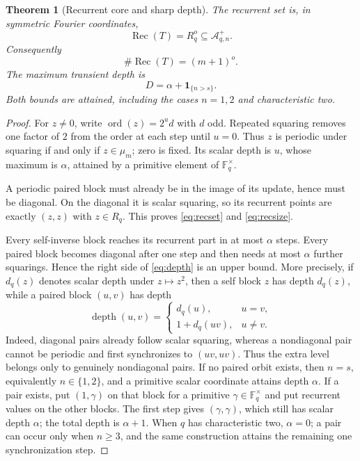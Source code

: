\documentclass[11pt,a4paper]{amsart}
\newcommand{\F}{\mathbb F}
\newcommand{\A}{\mathcal A}
\newcommand{\Rec}{\operatorname{Rec}}
\newcommand{\ord}{\operatorname{ord}}
\newcommand{\depth}{\operatorname{depth}}
\newtheorem{theorem}{Theorem}[section]
\begin{document}
\begin{theorem}[Recurrent core and sharp depth]
\label{thm:depth}
The recurrent set is, in symmetric Fourier coordinates,
\begin{equation}
 \label{eq:recset}
 \Rec(T)=R_q^o\subseteq\A_{q,n}^+.
\end{equation}
Consequently
\begin{equation}
 \label{eq:recsize}
 \#\Rec(T)=(m+1)^o.
\end{equation}
The maximum transient depth is
\begin{equation}
 \label{eq:depth}
 D=\alpha+\mathbf1_{\{n>s\}}.
\end{equation}
Both bounds are attained, including the cases $n=1,2$ and characteristic
two.
\end{theorem}

\begin{proof}
For $z\neq0$, write $\ord(z)=2^u d$ with $d$ odd.  Repeated squaring removes
one factor of $2$ from the order at each step until $u=0$.  Thus $z$ is
periodic under squaring if and only if $z\in\mu_m$; zero is fixed.  Its scalar
depth is $u$, whose maximum is $\alpha$, attained by a primitive element of
$\F_q^\times$.

A periodic paired block must already be in the image of its update, hence
must be diagonal.  On the diagonal it is scalar squaring, so its recurrent
points are exactly $(z,z)$ with $z\in R_q$.  This proves \eqref{eq:recset}
and \eqref{eq:recsize}.

Every self-inverse block reaches its recurrent part in at most $\alpha$
steps.  Every paired block becomes diagonal after one step and then needs at
most $\alpha$ further squarings.  Hence the right side of \eqref{eq:depth} is
an upper bound.  More precisely, if $d_q(z)$ denotes scalar depth under
$z\mapsto z^2$, then a self block $z$ has depth $d_q(z)$, while a paired
block $(u,v)$ has depth
\[
 \depth(u,v)=
 \begin{cases}
  d_q(u),&u=v,\\
  1+d_q(uv),&u\ne v.
 \end{cases}
\]
Indeed, diagonal pairs already follow scalar squaring, whereas a nondiagonal
pair cannot be periodic and first synchronizes to $(uv,uv)$.  Thus the extra
level belongs only to genuinely nondiagonal pairs.  If no paired orbit
exists, then $n=s$, equivalently
$n\in\{1,2\}$, and a primitive scalar coordinate attains depth $\alpha$.
If a pair exists, put $(1,\gamma)$ on that block for a primitive
$\gamma\in\F_q^\times$ and put recurrent values on the other blocks.  The
first step gives $(\gamma,\gamma)$, which still has scalar depth $\alpha$;
the total depth is $\alpha+1$.  When $q$ has characteristic two,
$\alpha=0$; a pair can occur only when $n\geq3$, and the same construction
attains the remaining one synchronization step.
\end{proof}
\end{document}
